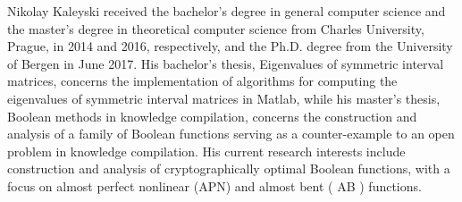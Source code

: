 \documentclass[10pt]{article}
\begin{document}
Nikolay Kaleyski received the bachelor's degree in general computer science and the master's degree in theoretical computer science from Charles University, Prague, in 2014 and 2016, respectively, and the Ph.D. degree from the University of Bergen in June 2017. His bachelor's thesis, Eigenvalues of symmetric interval matrices, concerns the implementation of algorithms for computing the eigenvalues of symmetric interval matrices in Matlab, while his master's thesis, Boolean methods in knowledge compilation, concerns the construction and analysis of a family of Boolean functions serving as a counter-example to an open problem in knowledge compilation. His current research interests include construction and analysis of cryptographically optimal Boolean functions, with a focus on almost perfect nonlinear (APN) and almost bent ( AB ) functions.
\end{document}
